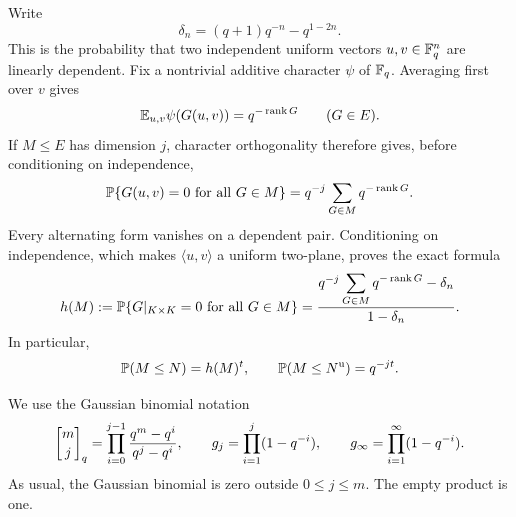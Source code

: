 Write
\[
 \delta_n=(q+1)q^{-n}-q^{1-2n}.
\]
This is the probability that two independent uniform vectors
$u,v\in\mathbb F_q^n$ are linearly dependent.  Fix a nontrivial additive
character $\psi$ of $\mathbb F_q$.  Averaging first over $v$ gives
\begin{equation}
 \mathbb E_{u,v}\psi(G(u,v))=q^{-\operatorname{rank}G}
 \qquad(G\in E).
 \label{ker:rank-fourier}
\end{equation}
If $M\le E$ has dimension $j$, character orthogonality therefore
gives, before conditioning on independence,
\[
 \mathbb P\{G(u,v)=0\text{ for all }G\in M\}
 =q^{-j}\sum_{G\in M}q^{-\operatorname{rank}G}.
\]
Every alternating form vanishes on a dependent pair.  Conditioning
on independence, which makes $\langle u,v\rangle$ a uniform
two-plane, proves the exact formula
\begin{equation}
 h(M):=\mathbb P\{G|_{K\times K}=0\text{ for all }G\in M\}
 =\frac{q^{-j}\displaystyle\sum_{G\in M}
                 q^{-\operatorname{rank}G}-\delta_n}
        {1-\delta_n}.
 \label{ker:survival}
\end{equation}
In particular,
\begin{equation}
 \mathbb P(M\le N)=h(M)^t,
 \qquad
 \mathbb P(M\le N^{\mathrm u})=q^{-jt}.
 \label{ker:inclusion}
\end{equation}

We use the Gaussian binomial notation
\[
 \qbinom{m}{j}
 =\prod_{i=0}^{j-1}\frac{q^m-q^i}{q^j-q^i},
 \qquad
 g_j=\prod_{i=1}^j(1-q^{-i}),\qquad
 g_\infty=\prod_{i=1}^{\infty}(1-q^{-i}).
\]
As usual, the Gaussian binomial is zero outside $0\le j\le m$.
The empty product is one.

